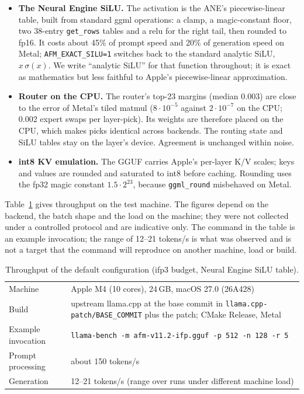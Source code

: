 \documentclass[11pt,reqno]{amsart}
\makeatletter
\newcommand{\code}[1]{\texttt{#1}}
\renewcommand\paragraph{\@startsection{paragraph}{4}\z@{.6\linespacing\@plus.2\linespacing}{-\fontdimen2\font}{\normalfont\bfseries}}
\theoremstyle{definition}
\makeatother
\begin{document}
\begin{itemize}
\item \textbf{The Neural Engine SiLU.} The activation is the ANE's piecewise-linear table, built from standard ggml operations: a clamp, a magic-constant floor, two 38-entry \code{get\_rows} tables and a relu for the right tail, then rounded to fp16. It costs about 45\% of prompt speed and 20\% of generation speed on Metal; \code{AFM\_EXACT\_SILU=1} switches back to the standard analytic SiLU, $x\,\sigma(x)$. We write ``analytic SiLU'' for that function throughout; it is exact as mathematics but less faithful to Apple's piecewise-linear approximation.
\item \textbf{Router on the CPU.} The router's top-23 margins (median 0.003) are close to the error of Metal's tiled matmul ($8\cdot10^{-5}$ against $2\cdot10^{-7}$ on the CPU; 0.002 expert swaps per layer-pick). Its weights are therefore placed on the CPU, which makes picks identical across backends. The routing state and SiLU tables stay on the layer's device. Agreement is unchanged within noise.
\item \textbf{int8 KV emulation.} The GGUF carries Apple's per-layer K/V scales; keys and values are rounded and saturated to int8 before caching. Rounding uses the fp32 magic constant $1.5\cdot2^{23}$, because \code{ggml\_round} misbehaved on Metal.
\end{itemize}
\paragraph{Speed.} Table~\ref{tab:bench} gives throughput on the test machine. The figures depend on the backend, the batch shape and the load on the machine; they were not collected under a controlled protocol and are indicative only. The command in the table is an example invocation; the range of 12--21 tokens/s is what was observed and is not a target that the command will reproduce on another machine, load or build.

\begin{table}[!htbp]
\centering\small
\begin{tabular}{@{}p{50mm}p{106mm}@{}}
\toprule
Machine & Apple M4 (10 cores), 24\,GB, macOS 27.0 (26A428) \\
Build & upstream llama.cpp at the base commit in \code{llama.cpp-patch/BASE\_COMMIT} plus the patch; CMake Release, Metal \\
Example invocation & \code{llama-bench -m afm-v11.2-ifp.gguf -p 512 -n 128 -r 5} \\
Prompt processing & about 150 tokens/s \\
Generation & 12--21 tokens/s (range over runs under different machine load) \\
\bottomrule
\end{tabular}
\caption{Throughput of the default configuration (ifp3 budget, Neural Engine SiLU table).}\label{tab:bench}
\end{table}
\end{document}
